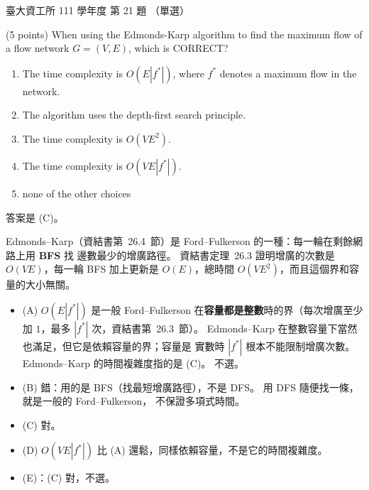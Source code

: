 \begin{pastexam}[label={px:ntu-111-dsaa-21}]{臺大資工所 111 學年度 第 21 題}
（單選）

(5 points) When using the Edmonds-Karp algorithm to find the maximum flow of a flow network
$G=(V,E)$, which is CORRECT?
\begin{enumerate}[label=(\Alph*)]
\item The time complexity is $O(E|f^*|)$, where $f^*$ denotes a maximum flow in the network.
\item The algorithm uses the depth-first search principle.
\item The time complexity is $O(VE^2)$.
\item The time complexity is $O(VE|f^*|)$.
\item none of the other choices
\end{enumerate}
\end{pastexam}

\begin{pastsoln}
答案是 (C)。

Edmonds--Karp（資結書第~26.4~節）是 Ford--Fulkerson 的一種：每一輪在剩餘網路上用 \textbf{BFS} 找
邊數最少的增廣路徑。 資結書定理~26.3 證明增廣的次數是 $O(VE)$，每一輪 BFS 加上更新是 $O(E)$，總時間
$O(VE^2)$，而且這個界和容量的大小無關。
\begin{itemize}
\item (A) $O(E|f^*|)$ 是一般 Ford--Fulkerson 在\textbf{容量都是整數}時的界（每次增廣至少加 $1$，最多
$|f^*|$ 次，資結書第~26.3~節）。 Edmonds--Karp 在整數容量下當然也滿足，但它是依賴容量的界；容量是
實數時 $|f^*|$ 根本不能限制增廣次數。 Edmonds--Karp 的時間複雜度指的是 (C)。 不選。
\item (B) 錯：用的是 BFS（找最短增廣路徑），不是 DFS。 用 DFS 隨便找一條，就是一般的 Ford--Fulkerson，
不保證多項式時間。
\item (C) 對。
\item (D) $O(VE|f^*|)$ 比 (A) 還鬆，同樣依賴容量，不是它的時間複雜度。
\item (E)：(C) 對，不選。
\end{itemize}
\end{pastsoln}
